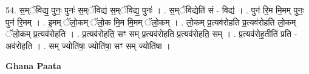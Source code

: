 \documentclass[17pt]{extarticle}
\begin{document}
54. स॒म्ॅविद्य॒ पुनः॒ पुनः॑ स॒म्ॅविद्य॑ स॒म्ॅविद्य॒ पुनः॑ । . स॒म्ॅविद्येति॑ सं - विद्य॑ । . पुन॑ रि॒म मि॒मम् पुनः॒ पुन॑ रि॒मम् । . इ॒मम् ॅलो॒कम् ॅलो॒क मि॒म मि॒मम् ॅलो॒कम् । . लो॒कम् प्र॒त्यव॑रोहति प्र॒त्यव॑रोहति लो॒कम् ॅलो॒कम् प्र॒त्यव॑रोहति । . प्र॒त्यव॑रोहति॒ सꣳ सम् प्र॒त्यव॑रोहति प्र॒त्यव॑रोहति॒ सम् । . प्र॒त्यव॑रोह॒तीति॑ प्रति - अव॑रोहति । . सम् ज्योति॑षा॒ ज्योति॑षा॒ सꣳ सम् ज्योति॑षा । \newline

\textbf{Ghana Paata } \newline
\end{document}
